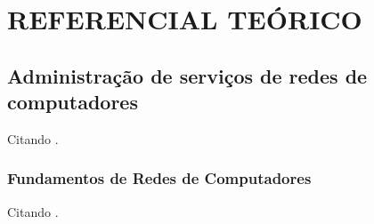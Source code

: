 \chapter{REFERENCIAL TEÓRICO}

\section{Administração de serviços de redes de computadores}
    
    Citando \cite{kurose2014}.
    
\subsection{Fundamentos de Redes de Computadores}

    Citando \cite{nakamura2007}.

    
